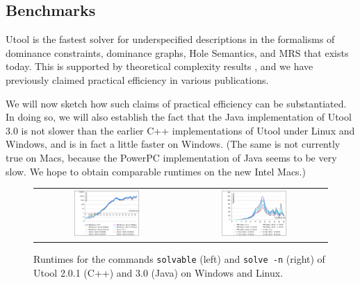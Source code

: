 \subsection{Benchmarks}

Utool is the fastest solver for underspecified descriptions in the
formalisms of dominance constraints, dominance graphs, Hole Semantics,
and MRS that exists today. This is supported by theoretical complexity
results
\cite{Althaus-J.Algo.,bodirsky-weakly-normal-constraints,KolTha05b},
and we have previously claimed practical efficiency in various
publications.

We will now sketch how such claims of practical efficiency can be
substantiated. In doing so, we will also establish the fact that the
Java implementation of Utool 3.0 is not slower than the earlier C++
implementations of Utool under Linux and Windows, and is in fact a
little faster on Windows. (The same is not currently true on Macs,
because the PowerPC implementation of Java seems to be very slow. We
hope to obtain comparable runtimes on the new Intel Macs.)

\begin{figure}
\centering
\begin{tabular}{cc}
\includegraphics[width=0.48\textwidth]{jh-extraction-mean.pdf}
&
\includegraphics[width=0.48\textwidth]{jh-chart-mean.pdf}
\end{tabular}
\caption{Runtimes for the commands \texttt{solvable} (left) and
\texttt{solve -n} (right) of Utool 2.0.1 (C++) and 3.0 (Java) on
Windows and Linux. \label{fig:runtimes}}
\end{figure}

